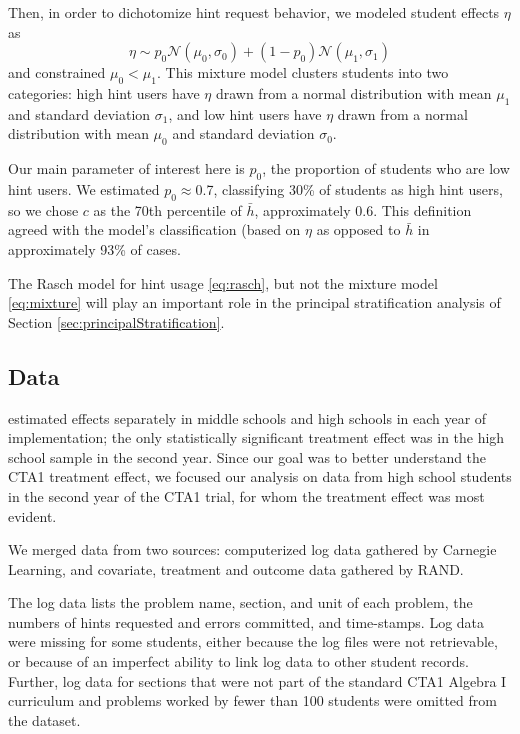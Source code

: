 \documentclass{article}\usepackage[]{graphicx}\usepackage[]{color}
\begin{document}
Then, in order to dichotomize hint request behavior, we modeled
student effects $\eta$ as
\begin{equation}\label{eq:mixture}
\eta\sim
p_0\mathcal{N}(\mu_0,\sigma_0)+(1-p_0)\mathcal{N}(\mu_1,\sigma_1)
\end{equation}
and constrained $\mu_0<\mu_1$.
This mixture model clusters students into two categories: high hint
users have $\eta$ drawn from a normal distribution with mean $\mu_1$
and standard deviation $\sigma_1$, and low hint users have $\eta$
drawn from a normal distribution with mean $\mu_0$ and standard
deviation $\sigma_0$.


Our main parameter of interest here is $p_0$, the proportion of
students who are low hint users.
We estimated $p_0\approx$0.7,
classifying 30\% of students as
high hint users, so we chose $c$ as the
70th percentile of $\bar{h}$,
approximately 0.6.
This definition agreed with the model's classification (based on
$\eta$ as opposed to $\bar{h}$ in
approximately 93\% of cases.

The Rasch model for hint usage \eqref{eq:rasch}, but not the mixture
model \eqref{eq:mixture} will play an important role in the principal
stratification analysis of Section \ref{sec:principalStratification}.



\subsection{Data}\label{sec:data}

\citep{pane2014effectiveness} estimated effects separately in middle
schools and high schools in each year of implementation; the
only statistically significant treatment effect was in the high school
sample in the second year.
Since our goal was to better understand the CTA1
treatment effect, we focused our analysis on data from high school students in
the second year of the CTA1 trial, for whom the treatment effect was
most evident.

We merged data from two sources: computerized log data gathered by
Carnegie Learning, and covariate, treatment and outcome data gathered by RAND.

The log data lists the problem name, section, and unit of
each problem, the numbers of hints requested and errors committed, and time-stamps.
Log data were missing for some students, either because the log files
were not retrievable, or because of an imperfect ability to link log
data to other student records.
Further, log data for sections that were not part of the
standard CTA1 Algebra I curriculum and problems worked by fewer than 100
students were omitted from the
dataset.
\end{document}
